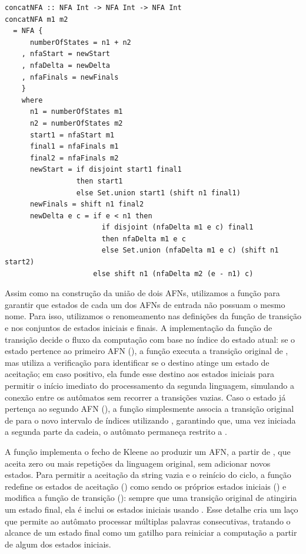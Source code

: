 \begin{verbatim}
concatNFA :: NFA Int -> NFA Int -> NFA Int
concatNFA m1 m2
  = NFA {
      numberOfStates = n1 + n2
    , nfaStart = newStart
    , nfaDelta = newDelta
    , nfaFinals = newFinals
    }
    where
      n1 = numberOfStates m1
      n2 = numberOfStates m2
      start1 = nfaStart m1
      final1 = nfaFinals m1
      final2 = nfaFinals m2
      newStart = if disjoint start1 final1
                 then start1
                 else Set.union start1 (shift n1 final1)
      newFinals = shift n1 final2
      newDelta e c = if e < n1 then
                       if disjoint (nfaDelta m1 e c) final1
                       then nfaDelta m1 e c
                       else Set.union (nfaDelta m1 e c) (shift n1 start2)
                     else shift n1 (nfaDelta m2 (e - n1) c)
\end{verbatim}

Assim como na construção da união de dois AFNs, utilizamos a função
 para garantir que estados de cada um
dos AFNs de entrada não possuam o mesmo nome. Para isso, utilizamos o
renomeamento nas definições da função de transição e nos conjuntos de
estados iniciais e finais. A implementação da função de transição
 decide o fluxo da computação com
base no índice do estado atual: se o estado pertence ao primeiro AFN
(), a função executa a transição
original de , mas utiliza a verificação
 para identificar se o destino
atinge um estado de aceitação; em caso positivo, ela funde esse
destino aos estados iniciais para permitir o início imediato do
processamento da segunda linguagem, simulando a conexão entre os
autômatos sem recorrer a transições vazias. Caso o estado já pertença
ao segundo AFN (), a função
simplesmente associa a transição original de
 para o novo intervalo de índices
utilizando , garantindo que, uma vez
iniciada a segunda parte da cadeia, o autômato permaneça restrito a
.

A função  implementa o fecho de
Kleene ao produzir um AFN, a partir de ,
que aceita zero ou mais repetições da linguagem original, sem
adicionar novos estados. Para permitir a aceitação da string vazia e
o reinício do ciclo, a função redefine os estados de aceitação
() como sendo os próprios estados
iniciais () e modifica a função
de transição (): sempre que uma
transição original de  atingiria um
estado final, ela é inclui os estados iniciais usando
. Esse detalhe cria um laço que
permite ao autômato processar múltiplas palavras consecutivas,
tratando o alcance de um estado final como um gatilho para reiniciar
a computação a partir de algum dos estados iniciais.

